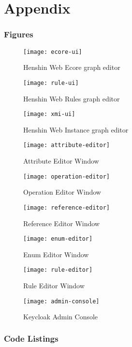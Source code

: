 \chapter{Appendix}
  \label{sec:appendix}

  \subsection{Figures}

  \begin{figure}[H]
    \centering
    \texttt{[image: ecore-ui]}
    \caption{Henshin Web Ecore graph editor}
    \label{fig:ecore-ui}
  \end{figure}

  \begin{figure}[H]
    \centering
    \texttt{[image: rule-ui]}
    \caption{Henshin Web Rules graph editor}
    \label{fig:rule-ui}
  \end{figure}

  \begin{figure}[H]
    \centering
    \texttt{[image: xmi-ui]}
    \caption{Henshin Web Instance graph editor}
    \label{fig:xmi-ui}
  \end{figure}

  \begin{figure}[h]
    \centering
    \texttt{[image: attribute-editor]}
    \caption{Attribute Editor Window}
    \label{fig:attribute-editor}
  \end{figure}
  \begin{figure}[h]
    \centering
    \texttt{[image: operation-editor]}
    \caption{Operation Editor Window}
    \label{fig:operation-editor}
  \end{figure}
  \begin{figure}[h]
    \centering
    \texttt{[image: reference-editor]}
    \caption{Reference Editor Window}
    \label{fig:reference-editor}
  \end{figure}
  \begin{figure}[h]
    \centering
    \texttt{[image: enum-editor]}
    \caption{Enum Editor Window}
    \label{fig:enum-editor}
  \end{figure}
    \begin{figure}[h]
    \centering
    \texttt{[image: rule-editor]}
    \caption{Rule Editor Window}
    \label{fig:rule-editor}
  \end{figure}
      \begin{figure}[h]
    \centering
    \texttt{[image: admin-console]}
    \caption{Keycloak Admin Console}
    \label{fig:admin-console}
  \end{figure}



  \subsection{Code Listings}



    

